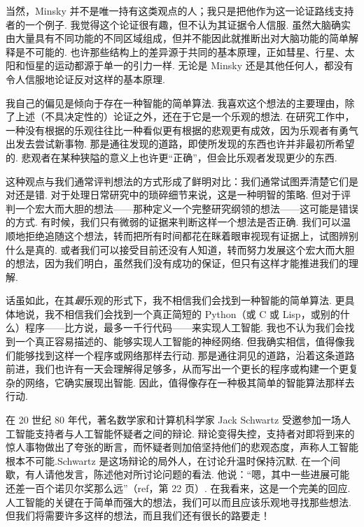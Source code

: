 当然，Minsky 并不是唯一持有这类观点的人；我只是把他作为这一论证路线支持者的一个例子. 我觉得这个论证很有趣，但不认为其证据令人信服. 虽然大脑确实由大量具有不同功能的不同区域组成，但并不能因此就推断出对大脑功能的简单解释是不可能的. 也许那些结构上的差异源于共同的基本原理，正如彗星、行星、太阳和恒星的运动都源于单一的引力一样. 无论是 Minsky 还是其他任何人，都没有令人信服地论证反对这样的基本原理.

我自己的偏见是倾向于存在一种智能的简单算法. 我喜欢这个想法的主要理由，除了上述（不具决定性的）论证之外，还在于它是一个乐观的想法. 在研究工作中，一种没有根据的乐观往往比一种看似更有根据的悲观更有成效，因为乐观者有勇气出发去尝试新事物. 那是通往发现的道路，即使所发现的东西也许并非最初所希望的. 悲观者在某种狭隘的意义上也许更``正确''，但会比乐观者发现更少的东西.

这种观点与我们通常评判想法的方式形成了鲜明对比：我们通常试图弄清楚它们是对还是错. 对于处理日常研究中的琐碎细节来说，这是一种明智的策略. 但对于评判一个宏大而大胆的想法——那种定义一个完整研究纲领的想法——这可能是错误的方式. 有时候，我们只有微弱的证据来判断这样一个想法是否正确. 我们可以温顺地拒绝追随这个想法，转而把所有时间都花在眯着眼审视现有证据上，试图辨别什么是真的. 或者我们可以接受目前还没有人知道，转而努力发展这个宏大而大胆的想法，因为我们明白，虽然我们没有成功的保证，但只有这样才能推进我们的理解.

话虽如此，在其\emph{最}乐观的形式下，我不相信我们会找到一种智能的简单算法. 更具体地说，我不相信我们会找到一个真正简短的 Python（或 C 或 Lisp，或别的什么）程序——比方说，最多一千行代码——来实现人工智能. 我也不认为我们会找到一个真正容易描述的、能够实现人工智能的神经网络. 但我确实相信，值得像我们能够找到这样一个程序或网络那样去行动. 那是通往洞见的道路，沿着这条道路前进，我们也许有一天会理解得足够多，从而写出一个更长的程序或构建一个更复杂的网络，它确实展现出智能. 因此，值得像存在一种极其简单的智能算法那样去行动.

在 20 世纪 80 年代，著名数学家和计算机科学家 Jack Schwartz 受邀参加一场人工智能支持者与人工智能怀疑者之间的辩论. 辩论变得失控，支持者对即将到来的惊人事物做出了夸张的断言，而怀疑者则加倍坚持他们的悲观态度，声称人工智能根本不可能.Schwartz 是这场辩论的局外人，在讨论升温时保持沉默. 在一个间歇，有人请他发言，陈述他对所讨论问题的看法. 他说：``嗯，其中一些进展可能还差一百个诺贝尔奖那么远''（ref，第 22 页）. 在我看来，这是一个完美的回应. 人工智能的关键在于简单而强大的想法，我们可以而且应该乐观地寻找那些想法. 但我们将需要许多这样的想法，而且我们还有很长的路要走！
